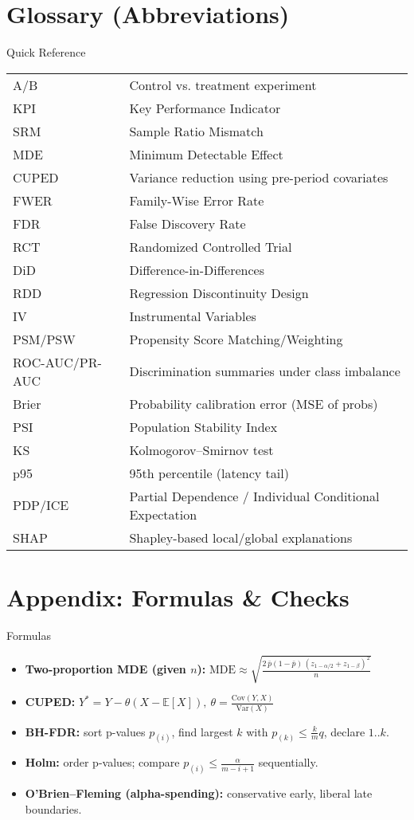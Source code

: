 \documentclass[aspectratio=169]{beamer}
\begin{document}
\section{Glossary (Abbreviations)}
\begin{frame}{Quick Reference}
\small
\begin{tabular}{@{}ll@{}}
\toprule
A/B & Control vs. treatment experiment \\
KPI & Key Performance Indicator \\
SRM & Sample Ratio Mismatch \\
MDE & Minimum Detectable Effect \\
CUPED & Variance reduction using pre-period covariates \\
FWER & Family-Wise Error Rate \\
FDR & False Discovery Rate \\
RCT & Randomized Controlled Trial \\
DiD & Difference-in-Differences \\
RDD & Regression Discontinuity Design \\
IV & Instrumental Variables \\
PSM/PSW & Propensity Score Matching/Weighting \\
ROC-AUC/PR-AUC & Discrimination summaries under class imbalance \\
Brier & Probability calibration error (MSE of probs) \\
PSI & Population Stability Index \\
KS & Kolmogorov--Smirnov test \\
p95 & 95th percentile (latency tail) \\
PDP/ICE & Partial Dependence / Individual Conditional Expectation \\
SHAP & Shapley-based local/global explanations \\
\bottomrule
\end{tabular}
\end{frame}

\section{Appendix: Formulas \& Checks}
\begin{frame}{Formulas}
\small
\begin{itemize}
  \item \textbf{Two-proportion MDE (given $n$):}
  \(\displaystyle \mathrm{MDE} \approx \sqrt{\frac{2\,\bar{p}(1-\bar{p})\,(z_{1-\alpha/2}+z_{1-\beta})^2}{n}}\)
  \item \textbf{CUPED:} \( Y^* = Y - \theta(X-\mathbb{E}[X]),\ \theta=\frac{\mathrm{Cov}(Y,X)}{\mathrm{Var}(X)} \)
  \item \textbf{BH-FDR:} sort p-values $p_{(i)}$, find largest $k$ with $p_{(k)} \leq \frac{k}{m}q$, declare $1..k$.
  \item \textbf{Holm:} order p-values; compare $p_{(i)} \leq \frac{\alpha}{m-i+1}$ sequentially.
  \item \textbf{O'Brien--Fleming (alpha-spending):} conservative early, liberal late boundaries.
\end{itemize}
\end{frame}
\end{document}
